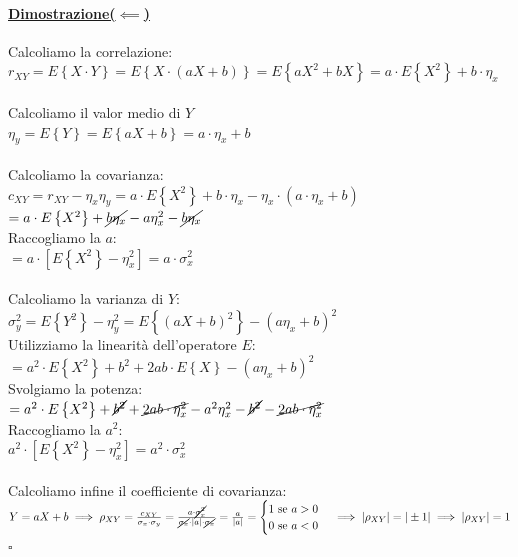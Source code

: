 \documentclass{article}
\begin{document}
\paragraph{\underline{Dimostrazione($\impliedby$)}}
Calcoliamo la correlazione: \\
$r_{XY} = E\left\{ X \cdot Y \right\} = E\left\{ X \cdot (aX+b) \right\} = E\left\{ aX^2 + bX \right\} = a \cdot E \left\{ X^2 \right\} + b \cdot \eta_x$ \\ \\
Calcoliamo il valor medio di $Y$ \\
$\eta_y = E \left\{ Y \right\} = E \left\{ aX + b \right\} = a \cdot \eta_x + b$ \\ \\
Calcoliamo la covarianza: \\
$c_{XY} = r_{XY} - \eta_x \eta_y = a \cdot E \left\{ X^2 \right\} + b\cdot \eta_x - \eta_x \cdot (a \cdot \eta_x + b)$ \\
$= a \cdot E \left\{ X^2 \right\} + \cancel{b \eta_x} - a \eta_x^2 - \cancel{b \eta_x}$ \\
Raccogliamo la $a$: \\
$= a \cdot \left[ E\left\{ X^2 \right\} - \eta_x^2 \right] = a \cdot \sigma_x^2$ \\ \\
Calcoliamo la varianza di $Y$: \\
$\sigma_y^2 = E\left\{ Y^2 \right\} - \eta_y^2 = E\left\{ (aX+b)^2 \right\} - (a\eta_x + b)^2$ \\
Utilizziamo la linearità dell'operatore $E$: \\
$= a^2 \cdot E\left\{ X^2 \right\} + b^2 + 2ab \cdot E\left\{ X \right\} - (a\eta_x + b)^2$ \\
Svolgiamo la potenza: \\
$= a^2 \cdot E\left\{ X^2 \right\} + \cancel{b^2} + \cancel{2ab \cdot \eta_x^2} - a^2\eta_x^2 - \cancel{b^2} - \cancel{2ab \cdot \eta_x^2}$ \\
Raccogliamo la $a^2$: \\
$a^2 \cdot \left[ E\left\{ X^2 \right\} - \eta_x^2 \right] = a^2 \cdot \sigma_x^2$ \\ \\
Calcoliamo infine il coefficiente di covarianza: \\
$Y = aX + b \implies \rho_{XY} = \frac{c_{XY}}{\sigma_x \cdot \sigma_y} = \frac{a \cdot \cancel{\sigma_x^2} }{\cancel{\sigma_x} \cdot |a| \cdot \cancel{\sigma_x}} = \frac{a}{|a|} = \begin{cases}
    1 \text{ se } a > 0 \\
    0 \text{ se } a < 0 
\end{cases} \implies |\rho_{XY}| = |\pm 1| \implies |\rho_{XY}| = 1$  \\
\hspace*{0pt}\hfill $\square$
\end{document}
